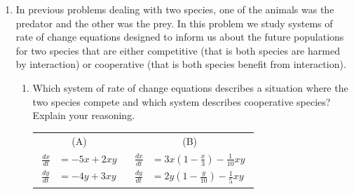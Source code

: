 \begin{enumerate}
\begin{center}
\end{center}

\clearpage

\item In previous problems dealing with two species, one of the animals was the predator and the other was the prey. In this problem we study systems of rate of change equations designed to inform us about the future populations for two species that are either competitive (that is both species are harmed by interaction) or cooperative (that is both species benefit from interaction). \label{09HWproblem5}

\begin{enumerate}
\item Which system of rate of change equations describes a situation where the two species compete and which system describes cooperative species? Explain your reasoning. \label{09HWproblem5parta}
\begin{center}
\begin{tabular}{cc}
	 (A)	&	(B)	\\
$\displaystyle \begin{aligned} \frac{dx}{dt} &= -5x+2xy\\ \frac{dy}{dt} &= -4y+3xy \end{aligned}$ &$\displaystyle \begin{aligned} \frac{dx}{dt} &= 3x(1-\frac{x}{3})-\frac{1}{10}xy\\ \frac{dy}{dt} &= 2y(1-\frac{y}{10})-\frac{1}{5}xy \end{aligned}$ 
\end{tabular}
\end{center}


\end{enumerate}
\end{enumerate}
